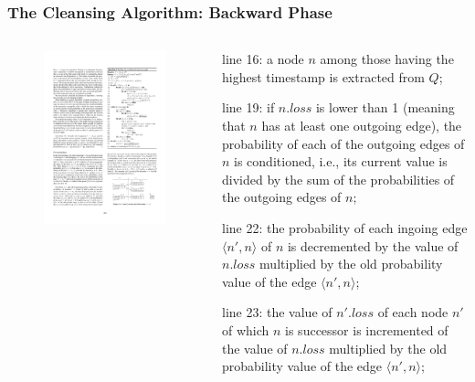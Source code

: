\begin{frame}
\frametitle{The Cleansing Algorithm: Backward Phase}

\begin{columns}

  \begin{figure}[tb]
    \includegraphics[width=\columnwidth]{figures/3-4/3-4-8.pdf}
  \end{figure}

  \begin{sitemize}
    \item line 16: a node $n$ among those having the highest timestamp is extracted from $Q$;
    \item line 19: if $n.loss$ is lower than 1 (meaning that $n$ has at least one outgoing edge), the probability of each of the outgoing edges of $n$ is conditioned, i.e., its current value is divided by the sum of the probabilities of the outgoing edges of $n$;
    \item line 22: the probability of each ingoing edge $\langle n',n \rangle$ of $n$ is decremented by the value of $n.loss$ multiplied by the old probability value of the edge $\langle n',n \rangle$;
    \item line 23: the value of $n'.loss$ of each node $n'$ of which $n$ is successor is incremented of the value of $n.loss$ multiplied by the old probability value of the edge $\langle n',n \rangle$;
  \end{sitemize}


\end{columns}
\end{frame}
